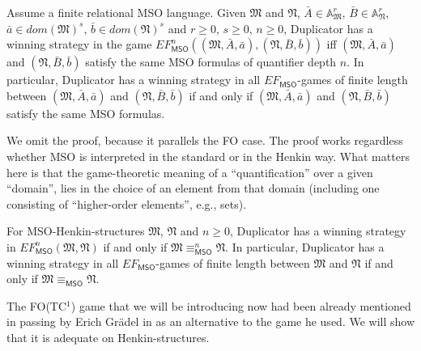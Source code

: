 \documentclass{LMCS}
\newcommand{\frM}{\mathfrak{M}}
\newcommand{\frN}{\mathfrak{N}}
\newcommand{\fo}{\textsf{FO}\xspace}
\newcommand{\mso}{\textsf{MSO}\xspace}
\newcommand{\fotc}{\textsf{FO(TC$^1$)}\xspace}
\begin{document}
\begin{thm}[\mso Adequacy]\label{thm:efmso}
 Assume a finite relational \mso language. Given $\frM$ and $\frN$, $\bar{A} \in \mathbb{A}_{\frM}^r$, $\bar{B} \in
 \mathbb{A}_{\frN}^r$, $\bar{a} \in dom(\frM)^s$, $\bar{b} \in dom(\frN)^s$ and  $r \geq 0$, $s \geq 0$, $n \geq 0$,
 Duplicator has a winning strategy in the game $EF_\mso^n((\frM,
 \bar{A}, \bar{a}), (\frN, \bar{B}, \bar{b}))$ iff
 $(\frM, \bar{A}, \bar{a})$ and $(\frN, \bar{B}, \bar{b})$ satisfy
 the same \mso formulas of quantifier depth $n$. In
 particular, Duplicator has a winning strategy in all $EF_\mso$-games of finite length between $(\frM, \bar{A}, \bar{a})$
 and $(\frN, \bar{B}, \bar{b})$ if and only if $(\frM, \bar{A}, \bar{a})$ and $(\frN, \bar{B}, \bar{b})$ satisfy the same \mso formulas.
\end{thm}

We omit the proof, because it parallels the \fo case.
The proof works regardless whether \mso is interpreted in the standard or in the Henkin way. What matters here is that the game-theoretic meaning of a ``quantification'' over a given ``domain'', lies in the choice of an element from that domain (including one consisting of ``higher-order elements'', e.g., sets).

\begin{cor}
For \mso-Henkin-structures $\frM$, $\frN$ and $n \geq 0$, Duplicator has a winning strategy in $EF_\mso^n(\frM,\frN)$ if and only if $\frM \equiv_\mso^n
\frN$. In particular, Duplicator has a winning strategy in all $EF_\mso$-games of finite length between $\frM$ and $\frN$ if and only if $\frM
\equiv_\mso \frN$.
\end{cor}


The \fotc game that we will be introducing now had been already mentioned in passing by Erich Gr\"{a}del in \cite{736267} as an alternative to the game he used. We will show that it is adequate on Henkin-structures.
\end{document}

